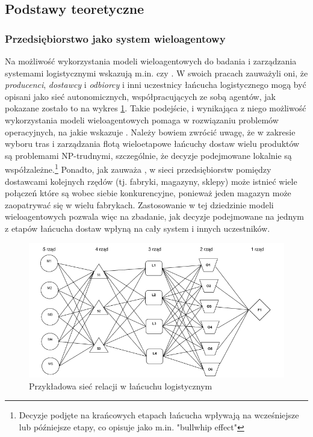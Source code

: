 \documentclass[polish, twoside, 12pt, a4paper]{article}
\theoremstyle{definition}
\theoremstyle{plain}
\theoremstyle{remark}
\begin{document}
\subsection{Podstawy teoretyczne} \label{teoria}
\subsubsection{Przedsiębiorstwo jako system wieloagentowy} 
Na możliwość wykorzystania modeli wieloagentowych do badania i zarządzania systemami logistycznymi wskazują m.in. \cite{Moyaux2006} czy \cite{Kawa2010}. W swoich pracach zauważyli oni, że  \textit{producenci},  \textit{dostawcy} i  \textit{odbiorcy} i inni uczestnicy łańcucha logistycznego mogą być opisani jako sieć autonomicznych, współpracujących ze sobą agentów, jak pokazane zostało to na wykres \ref{fig:siecKawa}. Takie podejście, i wynikająca z niego możliwość wykorzystania modeli wieloagentowych pomaga w rozwiązaniu problemów operacyjnych, na jakie wskazuje \cite{Kawa2010}. Należy bowiem zwrócić uwagę, że w zakresie wyboru tras i zarządzania flotą wieloetapowe łańcuchy dostaw wielu produktów są problemami NP-trudnymi, szczególnie, że decyzje podejmowane lokalnie są współzależne.\footnote{Decyzje podjęte na krańcowych etapach łańcucha wpływają na wcześniejsze lub późniejsze etapy, co \cite{Moyaux2006} opisuje jako m.in. "bullwhip effect"} Ponadto, jak zauważa \cite{Kawa2010}, w sieci przedsiębiorstw pomiędzy dostawcami kolejnych rzędów (tj. fabryki, magazyny, sklepy) może istnieć wiele połączeń które są wobec siebie konkurencyjne, ponieważ jeden magazyn może zaopatrywać się w wielu fabrykach. Zastosowanie w tej dziedzinie modeli wieloagentowych pozwala więc na zbadanie, jak decyzje podejmowane na jednym z etapów łańcucha dostaw wpłyną na cały system i innych uczestników.  

\begin{figure}
  \centering
\includegraphics[width=\linewidth]{pictures/siec.png}
  \caption{Przykładowa sieć relacji w łańcuchu logistycznym}
  \label{fig:siecKawa}

\end{figure}
\end{document}
